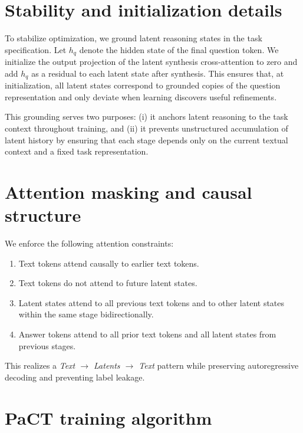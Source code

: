 % 

\newpage
\appendix
\onecolumn


\section{Stability and initialization details}
\label{app:stability}

To stabilize optimization, we ground latent reasoning states in the task specification. Let $h_q$
denote the hidden state of the final question token. We initialize the output projection of the latent
synthesis cross-attention to zero and add $h_q$ as a residual to each latent state after synthesis.
This ensures that, at initialization, all latent states correspond to grounded copies of the question
representation and only deviate when learning discovers useful refinements.

This grounding serves two purposes: (i) it anchors latent reasoning to the task context throughout
training, and (ii) it prevents unstructured accumulation of latent history by ensuring that each
stage depends only on the current textual context and a fixed task representation.

\section{Attention masking and causal structure}
\label{app:masking}

We enforce the following attention constraints:
\begin{enumerate}
  \item Text tokens attend causally to earlier text tokens.
  \item Text tokens do not attend to future latent states.
  \item Latent states attend to all previous text tokens and to other latent states within the same
  stage bidirectionally.
  \item Answer tokens attend to all prior text tokens and all latent states from previous stages.
\end{enumerate}
This realizes a \emph{Text $\rightarrow$ Latents $\rightarrow$ Text} pattern while preserving
autoregressive decoding and preventing label leakage.

\section{PaCT training algorithm}
\label{app:algorithm}

